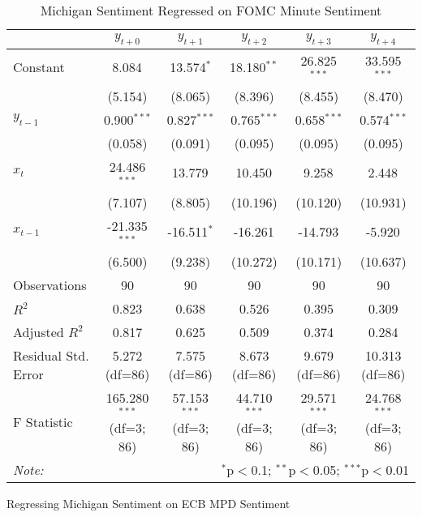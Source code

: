 \documentclass[12pt, letterpaper]{article}
\begin{document}
\begin{table}[H] \centering
  \caption{Michigan Sentiment Regressed on FOMC Minute Sentiment}
  \begin{adjustbox}{width=\textwidth}
\begin{tabular}{lccccc}
\hline
\hline
 & $y_{t+0}$ & $y_{t+1}$ & $y_{t+2}$ & $y_{t+3}$ & $y_{t+4}$  \\
\hline
 Constant & 8.084$^{}$ & 13.574$^{*}$ & 18.180$^{**}$ & 26.825$^{***}$ & 33.595$^{***}$ \\
& (5.154) & (8.065) & (8.396) & (8.455) & (8.470) \\
 $y_{t-1}$ & 0.900$^{***}$ & 0.827$^{***}$ & 0.765$^{***}$ & 0.658$^{***}$ & 0.574$^{***}$ \\
& (0.058) & (0.091) & (0.095) & (0.095) & (0.095) \\
 $x_{t}$ & 24.486$^{***}$ & 13.779$^{}$ & 10.450$^{}$ & 9.258$^{}$ & 2.448$^{}$ \\
& (7.107) & (8.805) & (10.196) & (10.120) & (10.931) \\
 $x_{t-1}$ & -21.335$^{***}$ & -16.511$^{*}$ & -16.261$^{}$ & -14.793$^{}$ & -5.920$^{}$ \\
& (6.500) & (9.238) & (10.272) & (10.171) & (10.637) \\
\hline
 Observations & 90 & 90 & 90 & 90 & 90 \\
 $R^2$ & 0.823 & 0.638 & 0.526 & 0.395 & 0.309 \\
 Adjusted $R^2$ & 0.817 & 0.625 & 0.509 & 0.374 & 0.284 \\
 Residual Std. Error & 5.272 (df=86) & 7.575 (df=86) & 8.673 (df=86) & 9.679 (df=86) & 10.313 (df=86) \\
 F Statistic & 165.280$^{***}$ (df=3; 86) & 57.153$^{***}$ (df=3; 86) & 44.710$^{***}$ (df=3; 86) & 29.571$^{***}$ (df=3; 86) & 24.768$^{***}$ (df=3; 86) \\
\hline
\hline
\textit{Note:} & \multicolumn{5}{r}{$^{*}$p$<$0.1; $^{**}$p$<$0.05; $^{***}$p$<$0.01} \\
\end{tabular}
\end{adjustbox}
\end{table}

Regressing Michigan Sentiment on ECB MPD Sentiment
\end{document}
